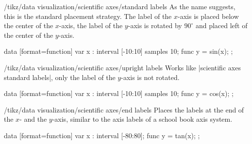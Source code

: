 \begin{key}{/tikz/data visualization/scientific axes/standard labels}
    As the name suggests, this is the standard placement strategy. The label of
    the $x$-axis is placed below the center of the $x$-axis, the label of the
    $y$-axis is rotated by $90^\circ$ and placed left of the center of the
    $y$-axis.
\begin{codeexample}[
    width=8cm,
    preamble={\usetikzlibrary{datavisualization.formats.functions}},
]
\tikz \datavisualization
 [scientific axes={clean, standard labels},
  visualize as smooth line,
  x axis={label=degree $d$,
    ticks={tick unit={}^\circ}},
  y axis={label=$\sin d$}]
data [format=function] {
  var x : interval [-10:10] samples 10;
  func y = sin(\value x);
};
\end{codeexample}
\end{key}

\begin{key}{/tikz/data visualization/scientific axes/upright labels}
    Works like |scientific axes standard labels|, only the label of the
    $y$-axis is not rotated.
\begin{codeexample}[
    width=8cm,
    preamble={\usetikzlibrary{datavisualization.formats.functions}},
]
\tikz \datavisualization [
  scientific axes={clean, upright labels},
  visualize as smooth line,
  x axis={label=degree $d$,
    ticks={tick unit={}^\circ}},
  y axis={label=$\cos d$, include value=1,
    ticks={style={
        /pgf/number format/precision=4,
        /pgf/number format/fixed zerofill}}}]
data [format=function] {
  var x : interval [-10:10] samples 10;
  func y = cos(\value x);
};
\end{codeexample}
\end{key}

\begin{key}{/tikz/data visualization/scientific axes/end labels}
    Places the labels at the end of the $x$- and the $y$-axis, similar to the
    axis labels of a school book axis system.
\begin{codeexample}[
    width=8cm,
    preamble={\usetikzlibrary{datavisualization.formats.functions}},
]
\tikz \datavisualization [
  scientific axes={clean, end labels},
  visualize as smooth line,
  x axis={label=degree $d$,
    ticks={tick unit={}^\circ}},
  y axis={label=$\tan d$}]
data [format=function] {
  var x : interval [-80:80];
  func y = tan(\value x);
};
\end{codeexample}
\end{key}


